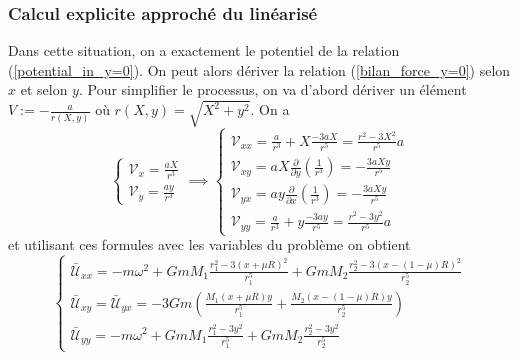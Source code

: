 \documentclass[12pt]{article}
\begin{document}
	\subsubsection{Calcul explicite approché du linéarisé}
	Dans cette situation, on a exactement le potentiel de la relation (\ref{potential_in_y=0}). On peut alors dériver la relation (\ref{bilan_force_y=0}) selon $x$ et selon $y$. Pour simplifier le processus, on va d'abord dériver un élément $V := -\frac{a}{r(X,y)}$ où $r(X,y) = \sqrt{X^2+y^2}$. On a
	\begin{equation}
		\begin{cases}
			\mathcal{V}_{x} = \frac{a X}{r^3}
			\\
			\mathcal{V}_{y} = \frac{a y}{r^3}
		\end{cases}
		\implies
		\begin{cases}
			\mathcal{V}_{xx} = \frac{a}{r^3} + X\frac{-3aX}{r^5} = \frac{r^2-3X^2}{r^5}a
			\\
			\mathcal{V}_{xy} = aX \frac{\partial}{\partial y}(\frac{1}{r^3}) = -\frac{3aXy}{r^5}
			\\
			\mathcal{V}_{yx} = ay \frac{\partial}{\partial x}(\frac{1}{r^3}) = -\frac{3aXy}{r^5}
			\\
			\mathcal{V}_{yy} = \frac{a}{r^3} + y\frac{-3ay}{r^5} = \frac{r^2-3y^2}{r^5}a
		\end{cases}
	\end{equation}
	et utilisant ces formules avec les variables du problème on obtient 
	\begin{equation}
		\begin{cases}
			\bar{\mathcal{U}}_{xx} = -m\omega^2 
			+ GmM_1\frac{r_1^2 - 3(x+\mu R)^2}{r_1^5} 
			+ GmM_2\frac{r_2^2 - 3(x-(1-\mu)R)^2}{r_2^5}
			\\
			\bar{\mathcal{U}}_{xy} = \bar{\mathcal{U}}_{yx} =
			-3Gm(\frac{M_1(x+\mu R)y}{r_1^5}+\frac{M_2(x-(1-\mu)R)y}{r_2^5})
			\\
			\bar{\mathcal{U}}_{yy} = -m\omega^2 
			+ GmM_1\frac{r_1^2 - 3y^2}{r_1^5} 
			+ GmM_2\frac{r_2^2 - 3y^2}{r_2^5}
		\end{cases}
	\end{equation}
	
\end{document}
